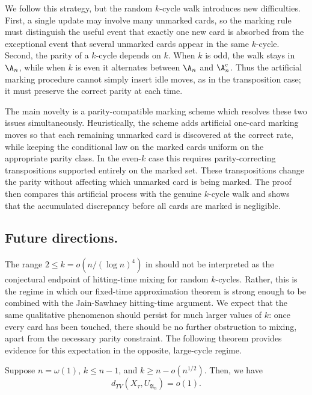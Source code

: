We follow this strategy, but the random $k$-cycle walk introduces new difficulties. First, a single update may involve many unmarked cards, so the
marking rule must distinguish the useful event that exactly one new card is absorbed from the exceptional event that several unmarked cards appear in the same $k$-cycle. Second, the parity of a $k$-cycle depends on $k$. When $k$ is
odd, the walk stays in $\A_n$, while when $k$ is even it alternates between $\A_n$ and $\A_n^c$. Thus the artificial marking procedure cannot simply insert idle moves, as in the transposition case; it must preserve the correct parity at
each time.

The main novelty is a parity-compatible marking scheme which resolves these two issues simultaneously. Heuristically, the scheme adds artificial one-card marking moves so that each remaining unmarked card is discovered at the correct rate, while keeping the conditional law on the marked cards uniform on the appropriate parity class. In the even-$k$ case this requires parity-correcting transpositions supported entirely on the marked set. These transpositions change
the parity without affecting which unmarked card is being marked. The proof then compares this artificial process with the genuine $k$-cycle walk and shows that the accumulated discrepancy before all cards are marked is negligible.

\subsection{Future directions.}

The range $2\leq k=o(n/(\log n)^4)$ in
 should not be interpreted as the
conjectural endpoint of hitting-time mixing for random $k$-cycles. Rather,
this is the regime in which our fixed-time approximation theorem is strong
enough to be combined with the Jain-Sawhney hitting-time argument. We expect
that the same qualitative phenomenon should persist for much larger values of
$k$: once every card has been touched, there should be no further obstruction
to mixing, apart from the necessary parity constraint. The following theorem provides
evidence for this expectation in the opposite, large-cycle regime.

\begin{thm}\label{thm: large cycle}
Suppose $n=\omega(1)$, $k\leq n-1$, and $k\geq n-o(n^{1/2})$. Then, we have
$$
d_{TV}(X_\tau,U_{\mathfrak A_n})=o(1).
$$
\end{thm}


